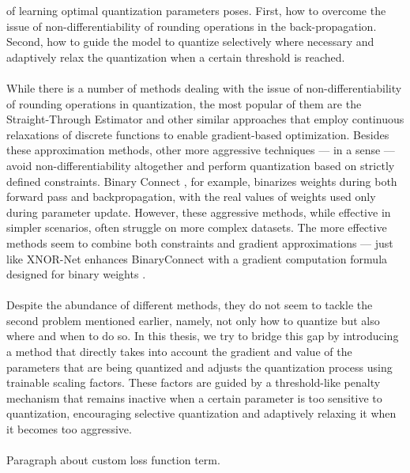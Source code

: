 of learning optimal quantization parameters poses. First, how to overcome the issue 
of non-differentiability of rounding operations in the back-propagation. 
Second, how to guide the model to quantize selectively where necessary
and adaptively relax the quantization when a certain threshold is reached. 
\\
\\
While there is a number of methods dealing with the issue of non-differentiability of rounding operations
in quantization, the most popular of them are the Straight-Through Estimator and other similar approaches 
that employ continuous relaxations of discrete functions to enable gradient-based optimization. 
Besides these approximation methods, other more aggressive techniques — in a sense — avoid 
non-differentiability altogether and perform quantization based on strictly defined constraints. 
Binary Connect \cite{courbariaux2015binaryconnect}, for example, binarizes weights during both forward pass and backpropagation, 
with the real values of weights used only during parameter update. 
However, these aggressive methods, while effective in simpler scenarios, 
often struggle on more complex datasets. The more effective methods seem to combine both constraints 
and gradient approximations — just like XNOR-Net enhances BinaryConnect with a 
gradient computation formula designed for binary weights \cite{rastegari2016xnor}. 
\\
\\
Despite the abundance of different methods, they do not seem to tackle the second problem mentioned earlier,
namely, not only how to quantize but also where and when to do so.
In this thesis, we try to bridge this gap by introducing a method 
that directly takes into account the gradient and value of the parameters that are being quantized 
and adjusts the quantization process using trainable scaling factors. 
These factors are guided by a threshold-like penalty mechanism 
that remains inactive when a certain parameter is too sensitive to quantization, 
encouraging selective quantization and adaptively relaxing it when it becomes too aggressive.
\\
\\
Paragraph about custom loss function term.